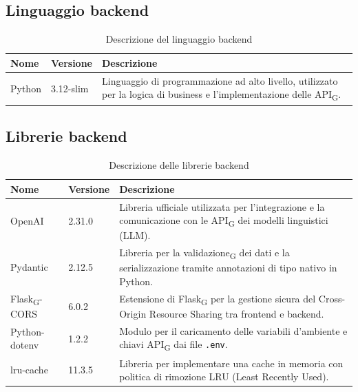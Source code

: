 \documentclass[11pt,a4paper]{article}
\newcommand{\gls}[1]{#1\textsubscript{G}}
\begin{document}
\subsection{Linguaggio backend}
\begin{table}[H]
    \centering
    \begin{tabular}{|p{}|p{}|p{}|}
        \hline
        \textbf{Nome} & \textbf{Versione} & \textbf{Descrizione} \\
        \hline
        Python & 3.12-slim & Linguaggio di programmazione ad alto livello, utilizzato per la logica di business e l'implementazione delle \gls{API}. \\
        \hline
    \end{tabular}
    \caption{Descrizione del linguaggio backend}
    \label{tab:linguaggio_backend}
\end{table}

\subsection{Librerie backend}
\begin{table}[H]
    \centering
    \begin{tabular}{|p{}|p{}|p{}|}
        \hline
        \textbf{Nome} & \textbf{Versione} & \textbf{Descrizione} \\
        \hline
        OpenAI & 2.31.0 & Libreria ufficiale utilizzata per l'integrazione e la comunicazione con le \gls{API} dei modelli linguistici (LLM). \\
        \hline
        Pydantic & 2.12.5 & Libreria per la \gls{validazione} dei dati e la serializzazione tramite annotazioni di tipo nativo in Python. \\
        \hline
        \gls{Flask}-CORS & 6.0.2 & Estensione di \gls{Flask} per la gestione sicura del Cross-Origin Resource Sharing tra frontend e backend. \\
        \hline
        Python-dotenv & 1.2.2 & Modulo per il caricamento delle variabili d'ambiente e chiavi \gls{API} dai file \texttt{.env}. \\
        \hline
        lru-cache & 11.3.5 & Libreria per implementare una cache in memoria con politica di rimozione LRU (Least Recently Used). \\
        \hline
    \end{tabular}
    \caption{Descrizione delle librerie backend}
    \label{tab:librerie_backend}
\end{table}
\end{document}
